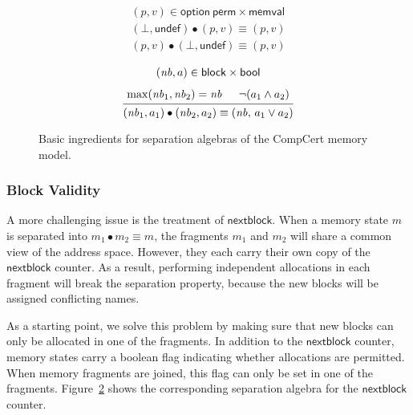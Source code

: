\documentclass[acmsmall,screen,review,anonymous]{acmart}
\newcommand{\kw}[1]{\ensuremath{ \mathsf{#1} }}
\begin{document}
\begin{figure}
  \begin{subfigure}{0.45\textwidth}
    \centering
    \fbox{$J_\kw{contents}$}
    \begin{gather*}
      (p, v) \in \kw{option}\ \kw{perm} \times \kw{memval} \\[1ex]
      (\bot, \kw{undef}) \bullet (p, v) \equiv (p, v) \\
      (p, v) \bullet (\bot, \kw{undef}) \equiv (p, v)
    \end{gather*}
    \label{fig:sepdef:contents}
  \end{subfigure}
  \begin{subfigure}{0.45\textwidth}
    \centering
    \fbox{$J_\kw{nextblock}$}
    \begin{gather*}
      (\mathit{nb}, a) \in \kw{block} \times \kw{bool}
      \\[1ex]
     {\begin{prooftree}
	\hypo{\mathrm{max}(\mathit{nb}_1, \mathit{nb}_2) = \mathit{nb}}
	\hypo{\lnot (a_1 \wedge a_2)}
	\infer2{(\mathit{nb}_1, a_1) \bullet (\mathit{nb}_2, a_2) \equiv
	  (\mathit{nb},\, a_1 \mathbin\vee a_2)}
      \end{prooftree}}
    \end{gather*}
    \label{fig:sepdef:fresh}
  \end{subfigure}
  \caption{%
    Basic ingredients for separation algebras
    of the CompCert memory model.}
  \label{fig:sepdef}
\end{figure}

\subsubsection{Block Validity}

A more challenging issue is the treatment of $\kw{nextblock}$.
When a memory state $m$ is separated into $m_1 \bullet m_2 \equiv m$,
the fragments $m_1$ and $m_2$ will share a common view of the address space.
However,
they each carry their own copy of the $\kw{nextblock}$ counter.
As a result,
performing independent allocations in each fragment
will break the separation property,
because the new blocks will be assigned conflicting names.

As a starting point,
we solve this problem by
making sure that new blocks
can only be allocated in one of the fragments.
In addition to the $\kw{nextblock}$ counter,
memory states carry a boolean flag
indicating whether allocations are permitted.
When memory fragments are joined,
this flag can only be set in one of the fragments.
Figure~\ref{fig:sepdef:fresh}
shows the corresponding separation algebra
for the $\kw{nextblock}$ counter.
\end{document}
